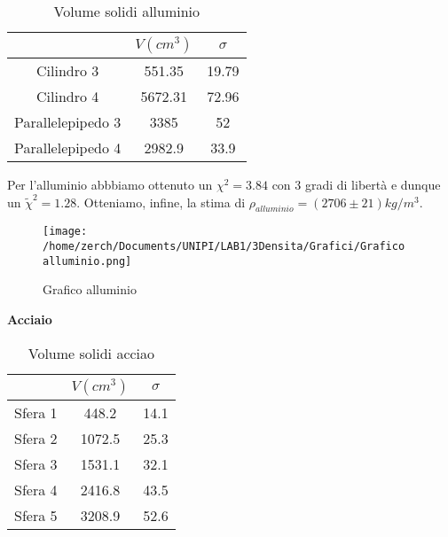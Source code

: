 \documentclass[a4paper,10pt]{article}
\begin{document}
\begin{table}[!htb]
\centering
\caption{Volume solidi alluminio}
\label{my-label}
\begin{tabular}{c|c|c}
\hline
                  & $V (cm^3)$ & $\sigma$ \\ \hline
Cilindro 3        & 551.35       & 19.79  \\ \hline
Cilindro 4        & 5672.31      & 72.96  \\ \hline
Parallelepipedo 3 & 3385         & 52     \\ \hline
Parallelepipedo 4 & 2982.9       & 33.9   \\ 
\end{tabular}
\end{table}
Per l'alluminio abbbiamo ottenuto un $\chi^2= 3.84$ con 3 gradi di libertà e dunque un $\tilde\chi^2=1.28$.
Otteniamo, infine, la stima di $\rho_{alluminio}=(2706 \pm 21)kg/m^3$.\\
\begin{figure}[!htb]
\begin{center}
 \centering 
 \caption{Grafico alluminio}
 \texttt{[image: /home/zerch/Documents/UNIPI/LAB1/3Densita/Grafici/Grafico alluminio.png]}
 \end{center}
\end{figure}
\textbf{Acciaio}
\begin{table}[!htb]
\centering
\caption{Volume solidi acciao}
\label{my-label}
\begin{tabular}{c|c|c}
\hline
                  & $V(cm^3)$ & $\sigma$  \\ \hline
Sfera 1           & 448.2        & 14.1   \\ \hline
Sfera 2           & 1072.5       & 25.3   \\ \hline
Sfera 3           & 1531.1       & 32.1   \\ \hline
Sfera 4           & 2416.8       & 43.5   \\ \hline
Sfera 5           & 3208.9       & 52.6   \\ \hline
\end{tabular}
\end{table}
\end{document}
